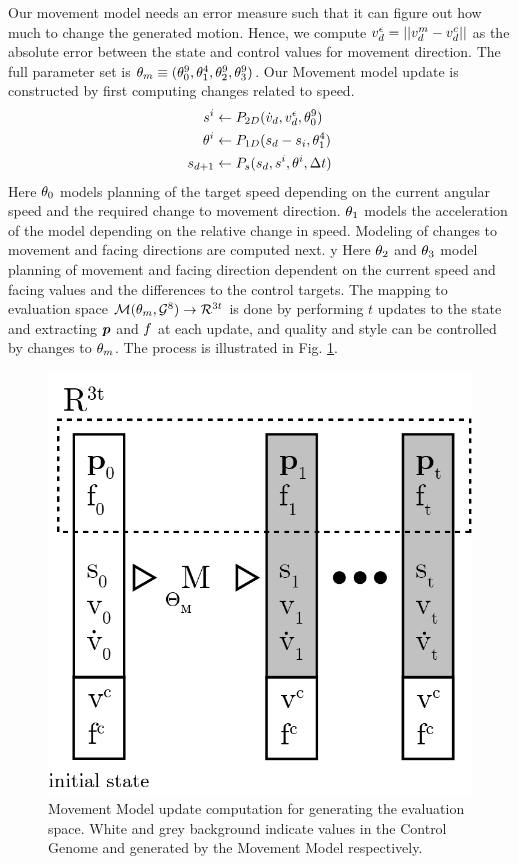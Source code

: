 Our movement model needs an error measure such that it can figure out how much to change the generated motion. Hence, we compute $v^\epsilon_d=||v_d^m-v^c_d||$ as the absolute error between the state and control values for movement direction. 
%
The full parameter set is $\theta_{m}\equiv(\theta_0^9,\theta_1^4,\theta_2^9,\theta_3^9)$. 
%
Our Movement model update is constructed by first computing  changes related to speed. 
\begin{subequations}
\begin{align}
    s^i&\leftarrow{}P_{2D}({\dot{v}}_d,v^\epsilon_d,\theta_0^9)\\
    \theta^i&\leftarrow{}P_{1D}(s_d-s_i, \theta_1^4)\\
    s_{d+1}&\leftarrow{}P_s(s_d,s^i,\theta^i,\Delta{t})
\end{align}
\end{subequations}
Here $\theta_0$  models planning of the target speed depending on the current angular speed and the required change to movement direction. $\theta_1$ models the acceleration of the model depending on the relative change in speed.
%
Modeling of changes to movement and facing directions are computed next. 
y
Here $\theta_2$ and $\theta_3$ model planning of movement and facing direction dependent on the current speed and facing values and the differences to the control targets.
%
The mapping to evaluation space $\mathcal{M}(\theta_{m}, \mathcal{G}^{8}) \rightarrow \mathcal{R}^{3t}$ is done by performing $t$ updates to the state and extracting $\boldsymbol{p }$ and $f$ at each update, and quality and style can be controlled by changes to $\theta_{m}$.  The process is illustrated in Fig. \ref{fig:control:modelflow}. 
\begin{figure}
    \centering
    \includegraphics[width=0.5\columnwidth]{img/model_flow.png}
    \caption{Movement Model update computation for generating the evaluation space. White and grey background indicate values in the Control Genome and generated by the Movement Model respectively. }
    \label{fig:control:modelflow}
\end{figure}


